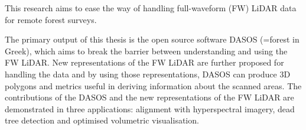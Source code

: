\documentclass{subfiles}
\begin{document}
	

	
\par This research aims to ease the way of handling full-waveform (FW) LiDAR  data for remote forest surveys. 
\par The primary output of this thesis is the open source software DASOS (=forest in Greek), which aims to break the barrier between understanding and using the FW LiDAR. New representations of the FW LiDAR are further proposed for handling the data and by using those representations, DASOS can produce 3D polygons and metrics useful in deriving information about the scanned areas. The contributions of the DASOS and the new representations of the FW LiDAR are demonstrated in three applications: alignment with hyperspectral imagery, dead tree detection and optimised volumetric visualisation.
\end{document}
